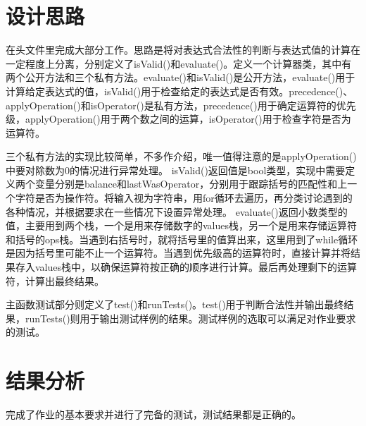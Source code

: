\documentclass[UTF8]{ctexart}
\begin{document}
\pagestyle{fancy}
\fancyhead{}

\section{设计思路}

在头文件里完成大部分工作。思路是将对表达式合法性的判断与表达式值的计算在一定程度上分离，分别定义了isValid()和evaluate()。定义一个计算器类，其中有两个公开方法和三个私有方法。evaluate()和isValid()是公开方法，evaluate()用于计算给定表达式的值，isValid()用于检查给定的表达式是否有效。precedence()、applyOperation()和isOperator()是私有方法，precedence()用于确定运算符的优先级，applyOperation()用于两个数之间的运算，isOperator()用于检查字符是否为运算符。

三个私有方法的实现比较简单，不多作介绍，唯一值得注意的是applyOperation()中要对除数为0的情况进行异常处理。
isValid()返回值是bool类型，实现中需要定义两个变量分别是balance和lastWasOperator，分别用于跟踪括号的匹配性和上一个字符是否为操作符。将输入视为字符串，用for循环去遍历，再分类讨论遇到的各种情况，并根据要求在一些情况下设置异常处理。
evaluate()返回小数类型的值，主要用到两个栈，一个是用来存储数字的values栈，另一个是用来存储运算符和括号的ops栈。当遇到右括号时，就将括号里的值算出来，这里用到了while循环是因为括号里可能不止一个运算符。当遇到优先级高的运算符时，直接计算并将结果存入values栈中，以确保运算符按正确的顺序进行计算。最后再处理剩下的运算符，计算出最终结果。

主函数测试部分则定义了test()和runTests()。test()用于判断合法性并输出最终结果，runTests()则用于输出测试样例的结果。测试样例的选取可以满足对作业要求的测试。

\section{结果分析}

完成了作业的基本要求并进行了完备的测试，测试结果都是正确的。
\end{document}
